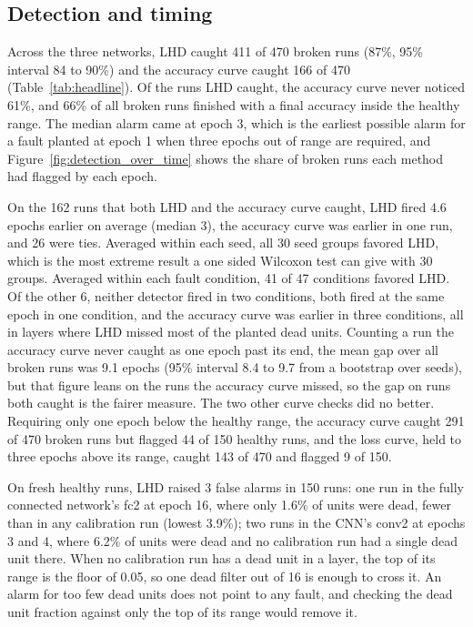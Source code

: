 \documentclass[11pt]{article}
\begin{document}
\subsection{Detection and timing}

Across the three networks, LHD caught 411 of 470 broken runs (87\%, 95\% interval 84 to 90\%) and the accuracy curve caught 166 of 470 (Table~\ref{tab:headline}). Of the runs LHD caught, the accuracy curve never noticed 61\%, and 66\% of all broken runs finished with a final accuracy inside the healthy range. The median alarm came at epoch 3, which is the earliest possible alarm for a fault planted at epoch 1 when three epochs out of range are required, and Figure~\ref{fig:detection_over_time} shows the share of broken runs each method had flagged by each epoch.

On the 162 runs that both LHD and the accuracy curve caught, LHD fired 4.6 epochs earlier on average (median 3), the accuracy curve was earlier in one run, and 26 were ties. Averaged within each seed, all 30 seed groups favored LHD, which is the most extreme result a one sided Wilcoxon test can give with 30 groups. Averaged within each fault condition, 41 of 47 conditions favored LHD. Of the other 6, neither detector fired in two conditions, both fired at the same epoch in one condition, and the accuracy curve was earlier in three conditions, all in layers where LHD missed most of the planted dead units. Counting a run the accuracy curve never caught as one epoch past its end, the mean gap over all broken runs was 9.1 epochs (95\% interval 8.4 to 9.7 from a bootstrap over seeds), but that figure leans on the runs the accuracy curve missed, so the gap on runs both caught is the fairer measure. The two other curve checks did no better. Requiring only one epoch below the healthy range, the accuracy curve caught 291 of 470 broken runs but flagged 44 of 150 healthy runs, and the loss curve, held to three epochs above its range, caught 143 of 470 and flagged 9 of 150.

On fresh healthy runs, LHD raised 3 false alarms in 150 runs: one run in the fully connected network's fc2 at epoch 16, where only 1.6\% of units were dead, fewer than in any calibration run (lowest 3.9\%); two runs in the CNN's conv2 at epochs 3 and 4, where 6.2\% of units were dead and no calibration run had a single dead unit there. When no calibration run has a dead unit in a layer, the top of its range is the floor of 0.05, so one dead filter out of 16 is enough to cross it. An alarm for too few dead units does not point to any fault, and checking the dead unit fraction against only the top of its range would remove it.
\end{document}
